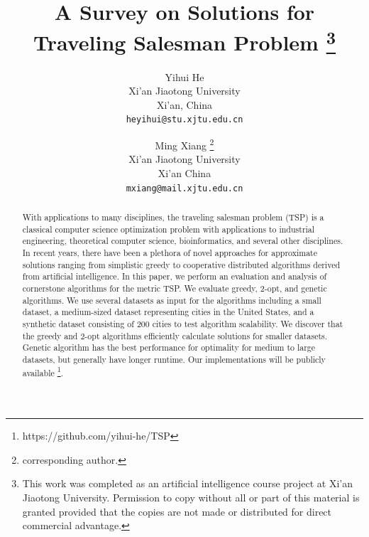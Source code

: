 \documentclass[10pt,twocolumn,letterpaper]{article}
\begin{document}
\title{A Survey on Solutions for Traveling Salesman Problem
\thanks{ This work was completed as an artificial intelligence course project at Xi'an Jiaotong University. Permission to copy without all or part of this material is granted provided that the copies are not made or distributed for direct commercial advantage.}
}

\author{Yihui He\\
Xi'an Jiaotong University\\
Xi'an, China\\
{\tt\small heyihui@stu.xjtu.edu.cn}
\and
Ming Xiang
\thanks{corresponding author.}\\
Xi'an Jiaotong University\\
Xi'an China\\
{\tt\small mxiang@mail.xjtu.edu.cn}
}

\maketitle

\begin{abstract}
With applications to many disciplines, the traveling salesman problem (TSP) is a classical computer science optimization problem with applications to industrial engineering, theoretical computer science, bioinformatics, and several other disciplines\cite{introduction}. In recent years, there have been a
plethora of novel approaches for approximate solutions ranging from simplistic greedy to cooperative distributed algorithms derived from artificial intelligence. In this paper,
we perform an evaluation and analysis of cornerstone algorithms for the metric TSP. We evaluate greedy, 2-opt, and genetic algorithms. We use
several datasets as input for the algorithms including a small dataset, a medium-sized dataset representing
cities in the United States, and a synthetic dataset consisting of 200 cities to test algorithm scalability. We discover that
the greedy and 2-opt algorithms efficiently calculate solutions for smaller datasets. Genetic algorithm has the best
performance for optimality for medium
to large datasets, but generally have longer runtime. Our implementations will be publicly available \footnote{https://github.com/yihui-he/TSP}.
\end{abstract}
\end{document}
